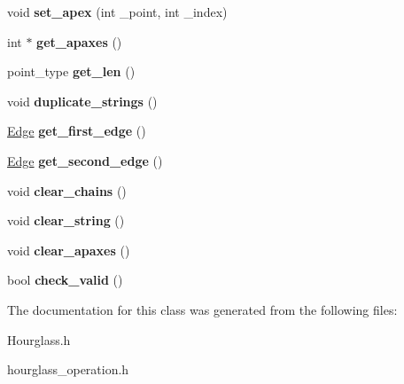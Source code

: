 \begin{DoxyCompactItemize}
\item 
\mbox{\label{class_hourglass_a3b773eeff5da5dc3998f5492885966ff}} 
void {\bfseries set\+\_\+apex} (int \+\_\+point, int \+\_\+index)
\item 
\mbox{\label{class_hourglass_aad11930e4ed241f81d3f33af355ea7f6}} 
int $\ast$ {\bfseries get\+\_\+apaxes} ()
\item 
\mbox{\label{class_hourglass_a6515a387a4950520ed4e90662ec78de7}} 
point\+\_\+type {\bfseries get\+\_\+len} ()
\item 
\mbox{\label{class_hourglass_a94a0055f53369dba512a00bc20370d1d}} 
void {\bfseries duplicate\+\_\+strings} ()
\item 
\mbox{\label{class_hourglass_a18a1e2ac5d80dc2235a33aefc579f9db}} 
\mbox{\hyperlink{class_edge}{Edge}} {\bfseries get\+\_\+first\+\_\+edge} ()
\item 
\mbox{\label{class_hourglass_a08c8110095f37a681b35d6b9ebfe9a17}} 
\mbox{\hyperlink{class_edge}{Edge}} {\bfseries get\+\_\+second\+\_\+edge} ()
\item 
\mbox{\label{class_hourglass_a91b341876b1e003302c033744f70a651}} 
void {\bfseries clear\+\_\+chains} ()
\item 
\mbox{\label{class_hourglass_a268c5a01f47d203391f88e4dda81e2b7}} 
void {\bfseries clear\+\_\+string} ()
\item 
\mbox{\label{class_hourglass_a6fdc91fae4b686435c719a340ad1249f}} 
void {\bfseries clear\+\_\+apaxes} ()
\item 
\mbox{\label{class_hourglass_aa54eca2c633f22875e33b11e1ffb7a7b}} 
bool {\bfseries check\+\_\+valid} ()
\end{DoxyCompactItemize}


The documentation for this class was generated from the following files\+:\begin{DoxyCompactItemize}
\item 
Hourglass.\+h\item 
hourglass\+\_\+operation.\+h\end{DoxyCompactItemize}
